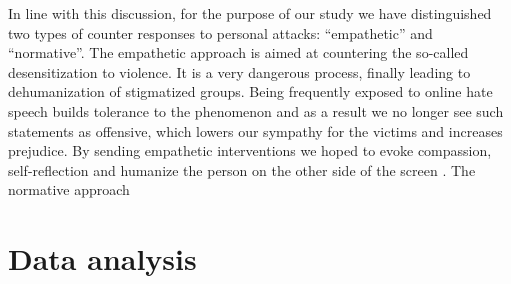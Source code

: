 \documentclass[preprint,12pt]{elsarticle}
\begin{document}
 
 
 In line with this discussion, for the purpose of our study we have distinguished two types of counter responses to personal attacks: ``empathetic'' and ``normative''. The empathetic approach is aimed at countering the so-called desensitization to violence. It is a very dangerous process, finally leading to dehumanization of stigmatized groups. %
 Being frequently exposed to online hate speech builds tolerance to the phenomenon and as a result we no longer see such statements as offensive, which lowers our sympathy for the victims and increases prejudice. By sending empathetic interventions we hoped to evoke compassion, self-reflection and humanize the person on the other side of the screen \citep{bilewicz2021artificial}.  The normative approach 
























\section{Data analysis}\label{sec{analysis}}
\end{document}
